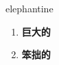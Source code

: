 
\begin{frame}
{\huge elephantine}
\begin{center}
\begin{enumerate}\Large
  \item \textbf{巨大的}
  \item \textbf{笨拙的}
\end{enumerate}
\end{center}
\end{frame}
